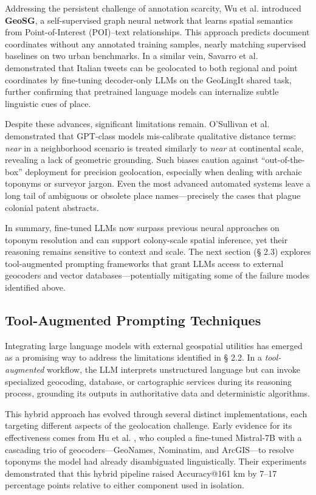 Addressing the persistent challenge of annotation scarcity, Wu et al.
\citep{wu2025geosg} introduced \textbf{GeoSG}, a self-supervised graph
neural network that learns spatial semantics from Point-of-Interest
(POI)--text relationships. This approach predicts document coordinates
without any annotated training samples, nearly matching supervised
baselines on two urban benchmarks. In a similar vein, Savarro et al.
\citep{savarro2024geolingit} demonstrated that Italian tweets can be
geolocated to both regional and point coordinates by fine-tuning
decoder-only LLMs on the GeoLingIt shared task, further confirming that
pretrained language models can internalize subtle linguistic cues of
place.

Despite these advances, significant limitations remain. O'Sullivan et
al. \citep{Osullivan2024_metric} demonstrated that GPT-class models
mis-calibrate qualitative distance terms: \emph{near} in a neighborhood
scenario is treated similarly to \emph{near} at continental scale,
revealing a lack of geometric grounding. Such biases caution against
``out-of-the-box'' deployment for precision geolocation, especially when
dealing with archaic toponyms or surveyor jargon. Even the most advanced
automated systems leave a long tail of ambiguous or obsolete place
names---precisely the cases that plague colonial patent abstracts.

In summary, fine-tuned LLMs now surpass previous neural approaches on
toponym resolution and can support colony-scale spatial inference, yet
their reasoning remains sensitive to context and scale. The next section
(§ 2.3) explores tool-augmented prompting frameworks that grant LLMs
access to external geocoders and vector databases---potentially
mitigating some of the failure modes identified above.

\subsection{Tool-Augmented Prompting
Techniques}\label{tool-augmented-prompting-techniques}

Integrating large language models with external geospatial utilities has
emerged as a promising way to address the limitations identified in §
2.2. In a \emph{tool-augmented} workflow, the LLM interprets
unstructured language but can invoke specialized geocoding, database, or
cartographic services during its reasoning process, grounding its
outputs in authoritative data and deterministic algorithms.

This hybrid approach has evolved through several distinct
implementations, each targeting different aspects of the geolocation
challenge. Early evidence for its effectiveness comes from Hu et al.
\citep{Hu2024_toponym_llm}, who coupled a fine-tuned Mistral-7B with a
cascading trio of geocoders---GeoNames, Nominatim, and ArcGIS---to
resolve toponyms the model had already disambiguated linguistically.
Their experiments demonstrated that this hybrid pipeline raised
Accuracy@161 km by 7--17 percentage points relative to either component
used in isolation.

